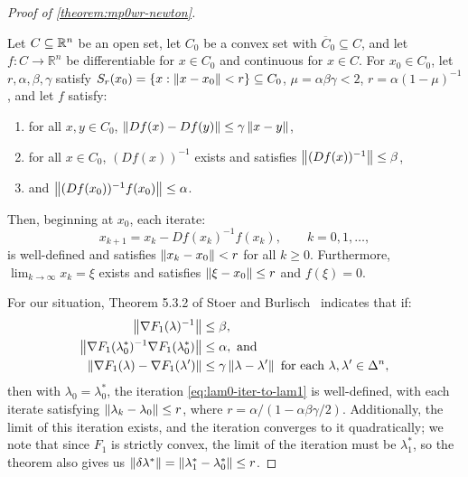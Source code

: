 \documentclass[eikonal.tex]{subfiles}
\begin{document}
\begin{proof}[Proof of \cref{theorem:mp0wr-newton}]

  \begin{theorem}
    Let $C \subseteq \mathbb{R}^n$ be an open set, let $C_0$ be a convex set
    with $\overline{C}_0 \subseteq C$, and let $f : C \to \mathbb{R}^n$
    be differentiable for $x \in C_0$ and continuous for $x \in C$. For
    $x_0 \in C_0$, let $r, \alpha, \beta, \gamma$ satisfy
    $S_r(x_0) = \left\{x : \left\|x - x_0\right\| < r\right\} \subseteq C_0$,
    $\mu = \alpha\beta\gamma < 2$, $r = \alpha(1 - \mu)^{-1}$, and let
    $f$ satisfy:
    \begin{enumerate}[label=(\alph*)]
    \item for all $x, y \in C_0$,
      $\left\|D f(x) - D f(y)\right\| \leq \gamma \left\|x - y\right\|$,
    \item for all $x \in C_0$, $(D f(x))^{-1}$ exists and satisfies
      $\left\|(Df(x))^{-1}\right\| \leq \beta$,
    \item and $\left\|(Df(x_0))^{-1} f(x_0)\right\| \leq \alpha$.
    \end{enumerate}
    Then, beginning at $x_0$, each iterate:
    \begin{equation}
      x_{k+1} = x_k - Df(x_k)^{-1} f(x_k), \qquad k = 0, 1, \hdots,
    \end{equation}
    is well-defined and satisfies $\left\|x_k - x_0\right\| < r$ for all
    $k \geq 0$. Furthermore, $\lim_{k \to \infty} x_k = \xi$ exists and
    satisfies $\left\|\xi - x_0\right\| \leq r$ and $f(\xi) = 0$.
  \end{theorem}

  For our situation, Theorem 5.3.2 of Stoer and
  Burlisch~\cite{stoer2013introduction} indicates that if:
  \begin{align}
    \norm{\nabla F_1(\lambda)^{-1}} &\leq \beta,\label{item:sb-newton-1} \\
    \norm{\nabla F_1(\lambda_0^*)^{-1} \nabla F_1(\lambda_0^*)} &\leq \alpha,\label{item:sb-newton-2} \mbox{ and} \\
    \norm{\nabla F_1(\lambda) - \nabla F_1(\lambda')} &\leq \gamma \norm{\lambda - \lambda'} \mbox{ for each } \lambda, \lambda' \in \Delta^n,\label{item:sb-newton-3}
  \end{align}
  then with $\lambda_0 = \lambda_0^*$, the iteration
  \cref{eq:lam0-iter-to-lam1} is well-defined, with each iterate
  satisfying $\left\|\lambda_k - \lambda_0\right\| \leq r$, where
  $r = \alpha/(1 - \alpha\beta\gamma/2)$. Additionally, the limit of
  this iteration exists, and the iteration converges to it
  quadratically; we note that since $F_1$ is strictly convex, the
  limit of the iteration must be $\lambda_1^*$, so the theorem also
  gives us
  $\left\|\delta\lambda^*\right\| = \left\|\lambda_1^* - \lambda_0^*\right\| \leq r$.


\end{proof}
\end{document}
